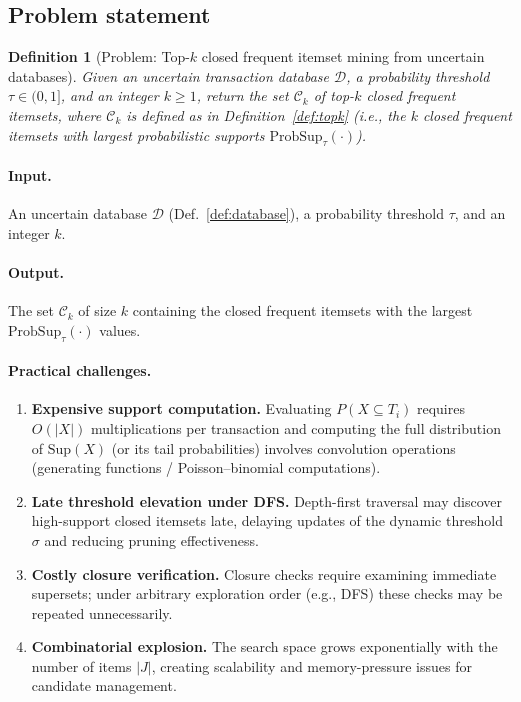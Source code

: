 \documentclass[10pt,letterpaper]{article}
\newtheorem{definition}{Definition}[section]
\newcounter{definition}
\begin{document}
\subsection*{Problem statement}
\label{subsec:problem_statement}

\begin{definition}[Problem: Top-$k$ closed frequent itemset mining from uncertain databases]
\label{def:problem_topk}
Given an uncertain transaction database $\mathcal{D}$, a probability threshold $\tau\in(0,1]$, and an integer $k\ge 1$, return the set $\mathcal{C}_k$ of top-$k$ closed frequent itemsets, where $\mathcal{C}_k$ is defined as in Definition~\ref{def:topk} (i.e., the $k$ closed frequent itemsets with largest probabilistic supports $\mathrm{ProbSup}_{\tau}(\cdot)$).
\end{definition}

\paragraph{Input.} An uncertain database $\mathcal{D}$ (Def.~\ref{def:database}), a probability threshold $\tau$, and an integer $k$.

\paragraph{Output.} The set $\mathcal{C}_k$ of size $k$ containing the closed frequent itemsets with the largest $\mathrm{ProbSup}_{\tau}(\cdot)$ values.

\paragraph{Practical challenges.}
\begin{enumerate}
  \item \textbf{Expensive support computation.} Evaluating $P(X\subseteq T_i)$ requires $O(|X|)$ multiplications per transaction and computing the full distribution of $\mathrm{Sup}(X)$ (or its tail probabilities) involves convolution operations (generating functions / Poisson--binomial computations).
  \item \textbf{Late threshold elevation under DFS.} Depth-first traversal may discover high-support closed itemsets late, delaying updates of the dynamic threshold $\sigma$ and reducing pruning effectiveness.
  \item \textbf{Costly closure verification.} Closure checks require examining immediate supersets; under arbitrary exploration order (e.g., DFS) these checks may be repeated unnecessarily.
  \item \textbf{Combinatorial explosion.} The search space grows exponentially with the number of items $|J|$, creating scalability and memory-pressure issues for candidate management.
\end{enumerate}
\end{document}
